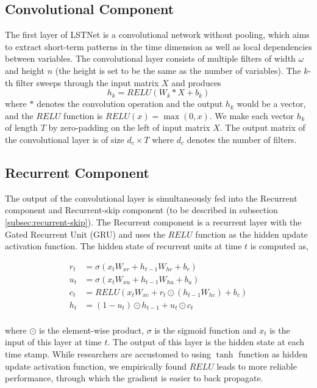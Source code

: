 \subsection{Convolutional Component}
The first layer of LSTNet is a convolutional network without pooling, which aims to extract short-term patterns in the time dimension as well as local dependencies between variables. The convolutional layer consists of multiple filters
of width $\omega$ and height $n$ (the height is set to be the same as the number of variables). The $k$-th filter sweeps through the input matrix $X$ and produces
\begin{equation}
h_k = RELU(W_k * X + b_k)
\end{equation}
where $*$ denotes the convolution operation and the output $h_k$ would be a vector, and the $RELU$ function is $RELU(x) = \max(0,x)$. We make each vector $h_k$ of length $T$ by zero-padding on the left of input matrix $X$. The output matrix of the convolutional layer is of size $d_c \times T$
where $d_c$ denotes the number of filters.

\subsection{Recurrent Component}
The output of the convolutional layer is simultaneously fed into the Recurrent component and Recurrent-skip component (to be described in subsection \ref{subsec:recurrent-skip}). The Recurrent component is a recurrent layer with the Gated Recurrent Unit (GRU) \cite{chung2014empirical} and uses the $RELU$ function as the hidden update activation function. The hidden state of recurrent units at time $t$ is computed as,

\begin{equation}
\begin{aligned}
r_t &= \sigma(x_tW_{xr} + h_{t-1}W_{hr} + b_r) \\
u_t &= \sigma(x_tW_{xu} + h_{t-1}W_{hu} + b_u) \\
c_t &= RELU(x_tW_{xc} + r_{t}\odot(h_{t-1}W_{hc}) + b_c) \\
h_t &= (1-u_t) \odot h_{t-1} + u_t \odot c_t \\
\end{aligned}
\label{eq:gru}
\end{equation}

where $\odot$ is the element-wise product, $\sigma$ is the sigmoid function and $x_t$ is the input of this layer at time $t$. The output of this layer is the hidden state at each time stamp. While researchers are accustomed to using $\tanh$ function as hidden update activation function, we empirically found $RELU$ leads to more reliable performance, through which the gradient is easier to back propagate. 

